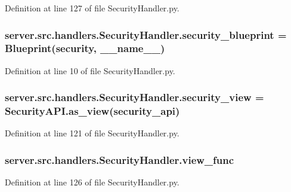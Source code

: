 Definition at line 127 of file Security\+Handler.\+py.

\subsubsection[{\texorpdfstring{security\+\_\+blueprint}{security_blueprint}}]{\setlength{\rightskip}{0pt plus 5cm}server.\+src.\+handlers.\+Security\+Handler.\+security\+\_\+blueprint = Blueprint(\textquotesingle{}security\textquotesingle{}, \+\_\+\+\_\+name\+\_\+\+\_\+)}\hypertarget{namespaceserver_1_1src_1_1handlers_1_1_security_handler_a6ee884f09597e3ae1848a96c670c59a6}{}\label{namespaceserver_1_1src_1_1handlers_1_1_security_handler_a6ee884f09597e3ae1848a96c670c59a6}


Definition at line 10 of file Security\+Handler.\+py.

\subsubsection[{\texorpdfstring{security\+\_\+view}{security_view}}]{\setlength{\rightskip}{0pt plus 5cm}server.\+src.\+handlers.\+Security\+Handler.\+security\+\_\+view = Security\+A\+P\+I.\+as\+\_\+view(\textquotesingle{}security\+\_\+api\textquotesingle{})}\hypertarget{namespaceserver_1_1src_1_1handlers_1_1_security_handler_a37d2ba45f3ea55adaf1dd7ba128a7127}{}\label{namespaceserver_1_1src_1_1handlers_1_1_security_handler_a37d2ba45f3ea55adaf1dd7ba128a7127}


Definition at line 121 of file Security\+Handler.\+py.

\subsubsection[{\texorpdfstring{view\+\_\+func}{view_func}}]{\setlength{\rightskip}{0pt plus 5cm}server.\+src.\+handlers.\+Security\+Handler.\+view\+\_\+func}\hypertarget{namespaceserver_1_1src_1_1handlers_1_1_security_handler_ab4b047d7ba77f3f3a53966cf8171751c}{}\label{namespaceserver_1_1src_1_1handlers_1_1_security_handler_ab4b047d7ba77f3f3a53966cf8171751c}


Definition at line 126 of file Security\+Handler.\+py.

